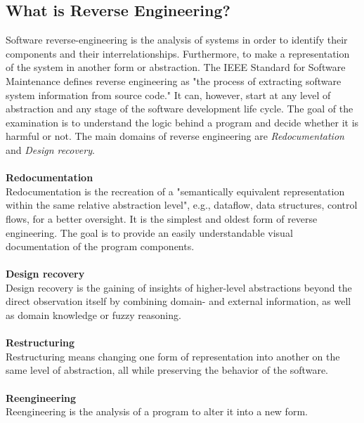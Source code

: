 \documentclass[seminar]{plai}
\begin{document}
\subsection{What is Reverse Engineering?}
\label{sec:reverse-engineering-background}
Software reverse-engineering is the analysis of systems in order to identify their components and their interrelationships. Furthermore, to make a representation of the system in another form or abstraction.\cite{reverse-engineering-design-recovery-taxonomy}
The IEEE Standard for Software Maintenance defines reverse engineering as "the process of extracting software system information from source code."\cite{ieeeStandard-for-SW-maintenance}
It can, however, start at any level of abstraction and any stage of the software development life cycle. The goal of the examination is to understand the logic behind a program and decide whether it is harmful or not. The main domains of reverse engineering are \textit{Redocumentation} and \textit{Design recovery}.
\\\\
\textbf{Redocumentation}\\
Redocumentation is the recreation of a "semantically equivalent representation within the same relative abstraction level"\cite[p.15]{reverse-engineering-design-recovery-taxonomy}, e.g., dataflow, data structures, control flows, for a better oversight.
It is the simplest and oldest form of reverse engineering. The goal is to provide an easily understandable visual documentation of the program components.\cite{reverse-engineering-design-recovery-taxonomy}
\\\\
\textbf{Design recovery}\\
Design recovery is the gaining of insights of higher-level abstractions beyond the direct observation itself by combining domain- and external information, as well as domain knowledge or fuzzy reasoning.\cite{reverse-engineering-design-recovery-taxonomy}
\\\\
\textbf{Restructuring}\\
Restructuring means changing one form of representation into another on the same level of abstraction, all while preserving the behavior of the software.\cite{reverse-engineering-design-recovery-taxonomy}
\\\\
\textbf{Reengineering}\\
Reengineering is the analysis of a program to alter it into a new form.
\end{document}

